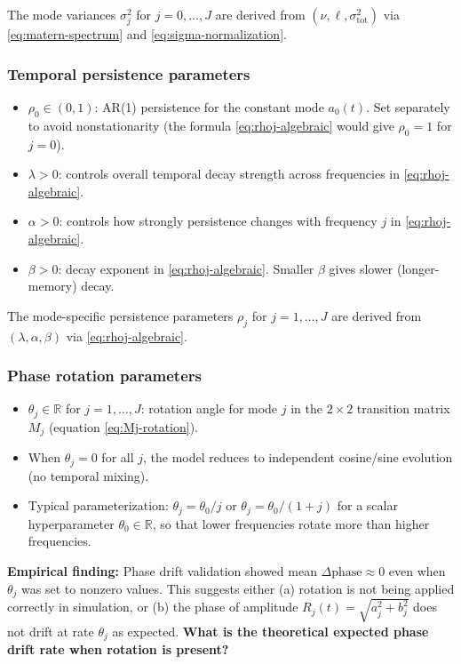 \documentclass[answers,12pt,addpoints]{exam}
\begin{document}
The mode variances $\sigma_j^2$ for $j=0,\dots,J$ are derived from $(\nu, \ell, \sigma^2_{\text{tot}})$ via \eqref{eq:matern-spectrum} and \eqref{eq:sigma-normalization}.

\subsubsection*{Temporal persistence parameters}

\begin{itemize}
  \item $\rho_0 \in (0,1)$: AR(1) persistence for the constant mode $a_0(t)$. Set separately to avoid nonstationarity (the formula \eqref{eq:rhoj-algebraic} would give $\rho_0 = 1$ for $j=0$).
  \item $\lambda > 0$: controls overall temporal decay strength across frequencies in \eqref{eq:rhoj-algebraic}.
  \item $\alpha > 0$: controls how strongly persistence changes with frequency $j$ in \eqref{eq:rhoj-algebraic}.
  \item $\beta > 0$: decay exponent in \eqref{eq:rhoj-algebraic}. Smaller $\beta$ gives slower (longer-memory) decay.
\end{itemize}

The mode-specific persistence parameters $\rho_j$ for $j=1,\dots,J$ are derived from $(\lambda, \alpha, \beta)$ via \eqref{eq:rhoj-algebraic}.

\subsubsection*{Phase rotation parameters}

\begin{itemize}
  \item $\theta_j \in \mathbb{R}$ for $j=1,\dots,J$: rotation angle for mode $j$ in the $2\times2$ transition matrix $M_j$ (equation \eqref{eq:Mj-rotation}).
  \item When $\theta_j = 0$ for all $j$, the model reduces to independent cosine/sine evolution (no temporal mixing).
  \item Typical parameterization: $\theta_j = \theta_0 / j$ or $\theta_j = \theta_0 / (1 + j)$ for a scalar hyperparameter $\theta_0 \in \mathbb{R}$, so that lower frequencies rotate more than higher frequencies.
\end{itemize}

{\color{blue}
\textbf{Empirical finding:} Phase drift validation showed mean $\Delta \text{phase} \approx 0$ even when $\theta_j$ was set to nonzero values. This suggests either (a) rotation is not being applied correctly in simulation, or (b) the phase of amplitude $R_j(t) = \sqrt{a_j^2 + b_j^2}$ does not drift at rate $\theta_j$ as expected. \textbf{What is the theoretical expected phase drift rate when rotation is present?}
}
\end{document}
